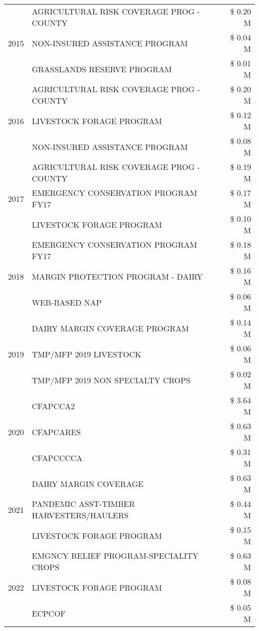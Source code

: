 \begin{tabular}{llr}
\cline{1-3}
\multirow[t]{3}{*}{2015} & AGRICULTURAL RISK COVERAGE PROG - COUNTY & \$ 0.20 M \\
 & NON-INSURED ASSISTANCE PROGRAM & \$ 0.04 M \\
 & GRASSLANDS RESERVE PROGRAM & \$ 0.01 M \\
\cline{1-3}
\multirow[t]{3}{*}{2016} & AGRICULTURAL RISK COVERAGE PROG - COUNTY & \$ 0.20 M \\
 & LIVESTOCK FORAGE PROGRAM & \$ 0.12 M \\
 & NON-INSURED ASSISTANCE PROGRAM & \$ 0.08 M \\
\cline{1-3}
\multirow[t]{3}{*}{2017} & AGRICULTURAL RISK COVERAGE PROG - COUNTY & \$ 0.19 M \\
 & EMERGENCY CONSERVATION PROGRAM FY17 & \$ 0.17 M \\
 & LIVESTOCK FORAGE PROGRAM & \$ 0.10 M \\
\cline{1-3}
\multirow[t]{3}{*}{2018} & EMERGENCY CONSERVATION PROGRAM FY17 & \$ 0.18 M \\
 & MARGIN PROTECTION PROGRAM - DAIRY & \$ 0.16 M \\
 & WEB-BASED NAP & \$ 0.06 M \\
\cline{1-3}
\multirow[t]{3}{*}{2019} & DAIRY MARGIN COVERAGE PROGRAM & \$ 0.14 M \\
 & TMP/MFP 2019 LIVESTOCK & \$ 0.06 M \\
 & TMP/MFP 2019 NON SPECIALTY CROPS & \$ 0.02 M \\
\cline{1-3}
\multirow[t]{3}{*}{2020} & CFAPCCA2 & \$ 3.64 M \\
 & CFAPCARES & \$ 0.63 M \\
 & CFAPCCCCA & \$ 0.31 M \\
\cline{1-3}
\multirow[t]{3}{*}{2021} & DAIRY MARGIN COVERAGE & \$ 0.63 M \\
 & PANDEMIC ASST-TIMBER HARVESTERS/HAULERS & \$ 0.44 M \\
 & LIVESTOCK FORAGE PROGRAM & \$ 0.15 M \\
\cline{1-3}
\multirow[t]{3}{*}{2022} & EMGNCY RELIEF PROGRAM-SPECIALITY CROPS & \$ 0.63 M \\
 & LIVESTOCK FORAGE PROGRAM & \$ 0.08 M \\
 & ECPCOF & \$ 0.05 M \\
\cline{1-3}
\bottomrule
\end{tabular}
